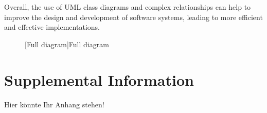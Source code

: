 \documentclass[
	12pt,
    a4paper,
    egregdoesnotlikesansseriftitles, %
    toc=chapterentrywithdots,
    oneside, openany,
    titlepage,
    parskip=half,
    headings=normal,  %
    listof=totoc,
    bibliography=totocnumbered,
    index=totoc,
    captions=tableheading,  %
    listof=flat,
    numbers=noenddot, %
    final]
    {scrbook}
\begin{document}
Overall, the use of UML class diagrams and complex relationships can help to improve the design and development of software systems, leading to more efficient and effective implementations.

\begin{figure}[p]
	\centering
	[Full diagram]{Full diagram}
	\label{fig:full}
\end{figure}



\backmatter

\printnoidxglossary[title=Symbol,nonumberlist]

%
%
%
\printbibliography

\clearpage %


\appendix
\chapter{Supplemental Information}\label{app:supplemental-information}
Hier könnte Ihr Anhang stehen!


\end{document}
